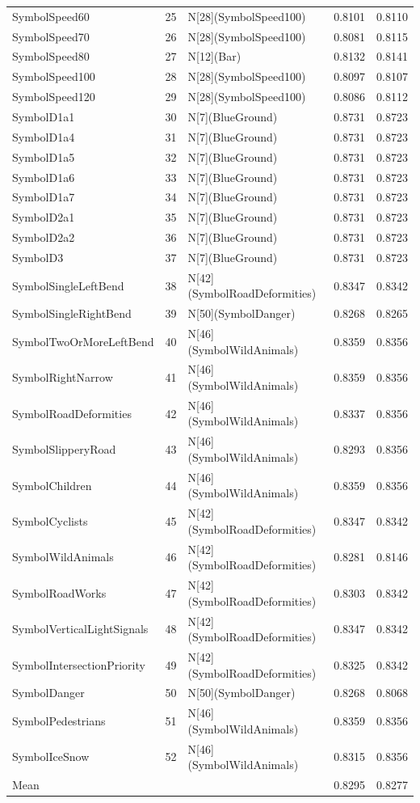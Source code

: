 \begin{tabular}{lllll}
SymbolSpeed60 & 25 & N[28](SymbolSpeed100) & 0.8101 & 0.8110 \\
SymbolSpeed70 & 26 & N[28](SymbolSpeed100) & 0.8081 & 0.8115 \\
SymbolSpeed80 & 27 & N[12](Bar) & 0.8132 & 0.8141 \\
SymbolSpeed100 & 28 & N[28](SymbolSpeed100) & 0.8097 & 0.8107 \\
SymbolSpeed120 & 29 & N[28](SymbolSpeed100) & 0.8086 & 0.8112 \\
SymbolD1a1 & 30 & N[7](BlueGround) & 0.8731 & 0.8723 \\
SymbolD1a4 & 31 & N[7](BlueGround) & 0.8731 & 0.8723 \\
SymbolD1a5 & 32 & N[7](BlueGround) & 0.8731 & 0.8723 \\
SymbolD1a6 & 33 & N[7](BlueGround) & 0.8731 & 0.8723 \\
SymbolD1a7 & 34 & N[7](BlueGround) & 0.8731 & 0.8723 \\
SymbolD2a1 & 35 & N[7](BlueGround) & 0.8731 & 0.8723 \\
SymbolD2a2 & 36 & N[7](BlueGround) & 0.8731 & 0.8723 \\
SymbolD3 & 37 & N[7](BlueGround) & 0.8731 & 0.8723 \\
SymbolSingleLeftBend & 38 & N[42](SymbolRoadDeformities) & 0.8347 & 0.8342 \\
SymbolSingleRightBend & 39 & N[50](SymbolDanger) & 0.8268 & 0.8265 \\
SymbolTwoOrMoreLeftBend & 40 & N[46](SymbolWildAnimals) & 0.8359 & 0.8356 \\
SymbolRightNarrow & 41 & N[46](SymbolWildAnimals) & 0.8359 & 0.8356 \\
SymbolRoadDeformities & 42 & N[46](SymbolWildAnimals) & 0.8337 & 0.8356 \\
SymbolSlipperyRoad & 43 & N[46](SymbolWildAnimals) & 0.8293 & 0.8356 \\
SymbolChildren & 44 & N[46](SymbolWildAnimals) & 0.8359 & 0.8356 \\
SymbolCyclists & 45 & N[42](SymbolRoadDeformities) & 0.8347 & 0.8342 \\
SymbolWildAnimals & 46 & N[42](SymbolRoadDeformities) & 0.8281 & 0.8146 \\
SymbolRoadWorks & 47 & N[42](SymbolRoadDeformities) & 0.8303 & 0.8342 \\
SymbolVerticalLightSignals & 48 & N[42](SymbolRoadDeformities) & 0.8347 & 0.8342 \\
SymbolIntersectionPriority & 49 & N[42](SymbolRoadDeformities) & 0.8325 & 0.8342 \\
SymbolDanger & 50 & N[50](SymbolDanger) & 0.8268 & 0.8068 \\
SymbolPedestrians & 51 & N[46](SymbolWildAnimals) & 0.8359 & 0.8356 \\
SymbolIceSnow & 52 & N[46](SymbolWildAnimals) & 0.8315 & 0.8356 \\
Mean &  &  & 0.8295 & 0.8277 \\
\bottomrule
\end{tabular}
